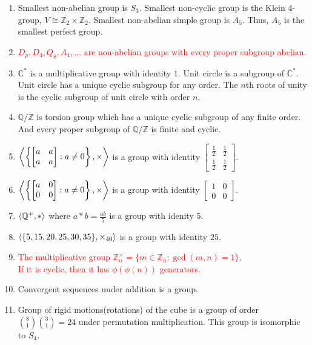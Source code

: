 \begin{enumerate}
	\item Smallest non-abelian group is $S_3$.
	Smallest non-cyclic group is the Klein $4$-group, $V \cong \mathbb{Z}_2 \times \mathbb{Z}_2$.
	Smallest non-abelian simple group is $A_5$. Thus, $A_5$ is the smallest perfect group.
	\item \textcolor{red}{$D_p, D_4, Q_8, A_4,\dots$ are non-abelian groups with every proper subgroup abelian}. 
	\item $\mathbb{C}^\ast$ is a multiplicative group with identity $1$.
	Unit circle is a subgroup of $\mathbb{C}^\ast$.
	Unit circle has a unique cyclic subgroup for any order.
	The $n$th roots of unity is the cyclic subgroup of unit circle with order $n$.
	\item $\mathbb{Q}/\mathbb{Z}$ is torsion group which has a unique cyclic subgroup of any finite order.
	And every proper subgroup of $\mathbb{Q}/\mathbb{Z}$ is finite and cyclic.
	\item $ \left\langle \left\{ \begin{bmatrix} a & a \\ a & a \end{bmatrix} : a \ne 0 \right\},\times \right\rangle$ is a group with identity $\begin{bmatrix} \frac{1}{2} & \frac{1}{2} \\ \frac{1}{2} & \frac{1}{2} \end{bmatrix}$.
	\item $ \left\langle \left\{ \begin{bmatrix} a & 0 \\ 0 & 0 \end{bmatrix} : a \ne 0 \right\},\times \right\rangle$ is a group with identity $\begin{bmatrix} 1 & 0 \\ 0 & 0 \end{bmatrix}$.
		\item $\left\langle \mathbb{Q}^+,\ast \right\rangle$ where $a \ast b = \frac{ab}{5}$ is a group with idenity $5$.
	\item $\left\langle \{5,15,20,25,30,35\},\times_{40} \right\rangle$ is a group with identity $25$.
	\item \textcolor{red}{The multiplicative group $\mathbb{Z}_n^\times = \{ m \in \mathbb{Z}_n : \gcd(m,n)=1 \}$.\\
		If it is cyclic, then it has $\phi(\phi(n))$ generators.}
	\item Convergent sequences under addition is a group.
	\item Group of rigid motions(rotations) of the cube is a group of order $\binom{8}{1}\binom{3}{1}=24$ under permutation multiplication.
	This group is isomorphic to $S_4$.
\end{enumerate}

